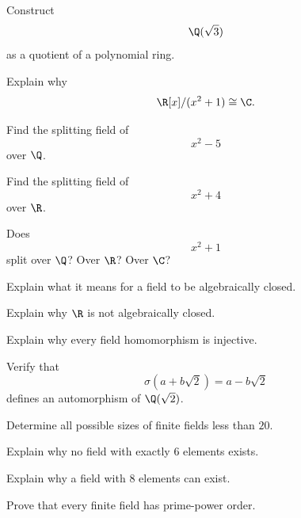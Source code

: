 \begin{exercise}[2]
Construct
\[ \Q(\sqrt3) \]
as a quotient of a polynomial ring.
\end{exercise}

\begin{exercise}[2]
Explain why
\[ \R[x]/(x^2+1)\cong\C. \]
\end{exercise}

\begin{exercise}[2]
Find the splitting field of
\[ x^2-5 \]
over \(\Q\).
\end{exercise}

\begin{exercise}[2]
Find the splitting field of
\[ x^2+4 \]
over \(\R\).
\end{exercise}

\begin{exercise}[2]
Does
\[ x^2+1 \]
split over \(\Q\)? Over \(\R\)? Over \(\C\)?
\end{exercise}

\begin{exercise}[2]
Explain what it means for a field to be algebraically closed.
\end{exercise}

\begin{exercise}[2]
Explain why \(\R\) is not algebraically closed.
\end{exercise}

\begin{exercise}[2]
Explain why every field homomorphism is injective.
\end{exercise}

\begin{exercise}[2]
Verify that
\[ \sigma(a+b\sqrt2)=a-b\sqrt2 \]
defines an automorphism of \(\Q(\sqrt2)\).
\end{exercise}

\begin{exercise}[2]
Determine all possible sizes of finite fields less than \(20\).
\end{exercise}

\begin{exercise}[2]
Explain why no field with exactly \(6\) elements exists.
\end{exercise}

\begin{exercise}[2]
Explain why a field with \(8\) elements can exist.
\end{exercise}

\begin{exercise}[3]
Prove that every finite field has prime-power order.
\end{exercise}


